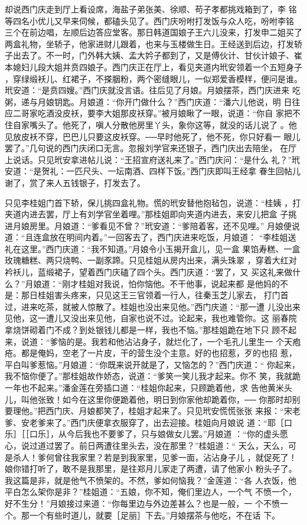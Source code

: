 却说西门庆走到厅上看设席，海盐子弟张美、徐顺、苟子孝都挑戏箱到了，李
铭等四名小优儿又早来伺候，都磕头见了。西门庆吩咐打发饭与众人吃，吩咐李铭
三个在前边唱，左顺后边答应堂客。那日韩道国娘子王六儿没来，打发申二姐买了
两盒礼物，坐轿子，他家进财儿跟着，也来与玉楼做生日。王经送到后边，打发轿
子出去了。不一时，门外韩大姨、孟大妗子都到了，又是傅伙计、甘伙计娘子、崔
本媳妇儿段大姐并贲四娘子。西门庆正在厅上，看见夹道内玳安领着一个五短身子
，穿绿缎袄儿、红裙子，不搽胭粉，两个密缝眼儿，一似郑爱香模样，便问是谁。
玳安道：“是贲四嫂。”西门庆就没言语。往后见了月娘。月娘摆茶，西门庆进来
吃粥，递与月娘钥匙。月娘道：“你开门做什么？”西门庆道：“潘六儿他说，明
日往应二哥家吃酒没皮袄，要李大姐那皮袄穿。”被月娘瞅了一眼，说道：“你自
家把不住自家嘴头了。他死了，嗔人分散他房里丫头，象你这等，就没的话儿说了
。他见放皮袄不穿，巴巴儿只要这皮袄穿。──早时他死了，他不死，你只好看一
眼儿罢了。”几句说的西门庆闭口无言。忽报刘学官来还银子，西门庆出去陪坐，
在厅上说话。只见玳安拿进帖儿说：“王招宣府送礼来了。”西门庆问：“是什么
礼？”玳安道：“是贺礼：一匹尺头、一坛南酒、四样下饭。”西门庆即叫王经拿
眷生回帖儿谢了，赏了来人五钱银子，打发去了。

只见李桂姐门首下轿，保儿挑四盒礼物。慌的玳安替他抱毡包，说道：“桂姨
，打夹道内进去罢，厅上有刘学官坐着哩。”那桂姐即向夹道内进去，来安儿把盒
子挑进月娘房里。月娘道：“爹看见不曾？”玳安道：“爹陪着客，还不见哩。”
月娘便说道：“且连盒放在明间内着。”一回客去了，西门庆进来吃饭，月娘道：
“李桂姐送礼在这里。”西门庆道：“我不知道。”月娘令小玉揭开盒儿，见一盒
果馅寿糕、一盒玫瑰糖糕、两只烧鸭、一副豕蹄。只见桂姐从房内出来，满头珠翠
，穿着大红对衿袄儿，蓝缎裙子，望着西门庆磕了四个头。西门庆道：“罢了，又
买这礼来做什么？”月娘道：“刚才桂姐对我说，怕你恼他。不干他事，说起来都
是他妈的不是：那日桂姐害头疼来，只见这王三官领着一行人，往秦玉芝儿家去，
打门首过，进来吃茶，就被人惊散了。桂姐也没出来见他。”西门庆道：“那一遭
儿没出来见他，这一遭儿又没出来见他，自家也说不过。论起来，我也难管你。这
丽春院拿烧饼砌着门不成？到处银钱儿都是一样，我也不恼。”那桂姐跪在地下只
顾不起来，说道：“爹恼的是。我若和他沾沾身子，就烂化了，一个毛孔儿里生一
个天疱疮。都是俺妈，空老了一片皮，干的营生没个主意。好的也招惹，歹的也招
惹，平白叫爹惹恼。”月娘道：“你既来说开就是了，又恼怎的？”西门庆道：“
你起来，我不恼你便了。”那桂姐故作娇态，说道：“爹笑一笑儿我才起来。你不
笑，我就跪一年也不起来。”潘金莲在旁插口道：“桂姐你起来，只顾跪着他，求
告他黄米头儿，叫他张致！如今在这里你便跪着他，明日到你家他却跪着你，──
你那时却别要理他。”把西门庆、月娘都笑了，桂姐才起来了。只见玳安慌慌张张
来报：“宋老爹、安老爹来了。”西门庆便拿衣服穿了，出去迎接。桂姐向月娘说
道：“耶［口乐］［［口乐］，从今后我也不要爹了，只与娘做女儿罢。”月娘道
：“你的虚头愿心，说过道过罢了。前日两遭往里头去，没在那里？”桂姐道：“
天么，天么，可是杀人！爹何曾往我家里？若是到我家里，见爹一面，沾沾身子儿
，就促死了！娘你错打听了，敢不是我那里，是往郑月儿家走了两遭，请了他家小
粉头子了。我这篇是非，就是他气不愤架的。不然，爹如何恼我？”金莲道：“各
人衣饭，他平白怎么架你是非？”桂姐道：“五娘，你不知，俺们里边人，一个气
不愤一个，好不生分！”月娘接过来道：“你每里边与外边差甚么？也是一般，一
个不愤一个。那一个有些时道儿，就要［足丽］下去。”月娘摆茶与他吃，不在话
下。

